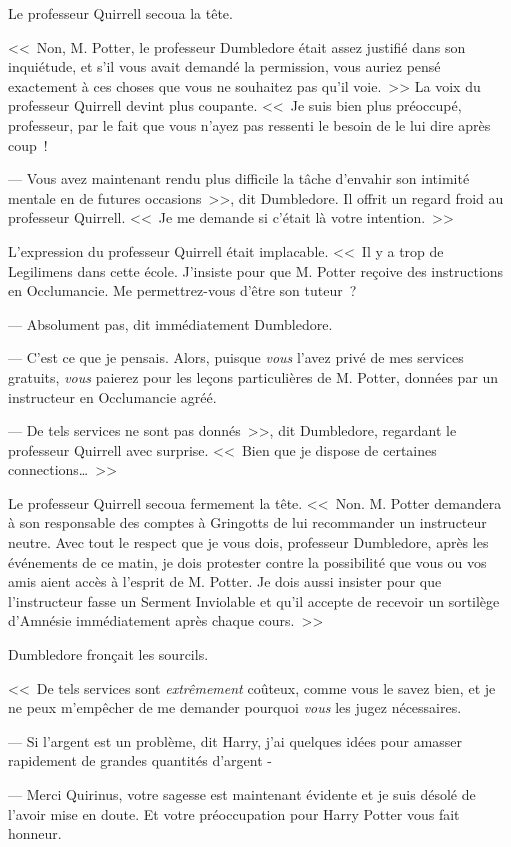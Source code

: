 Le professeur Quirrell secoua la tête.

<<~Non, M. Potter, le professeur Dumbledore était assez justifié dans son inquiétude, et s'il vous avait demandé la permission, vous auriez pensé exactement à ces choses que vous ne souhaitez pas qu'il voie.~>> La voix du professeur Quirrell devint plus coupante. <<~Je suis bien plus préoccupé, professeur, par le fait que vous n'ayez pas ressenti le besoin de le lui dire après coup~!

--- Vous avez maintenant rendu plus difficile la tâche d'envahir son intimité mentale en de futures occasions~>>, dit Dumbledore. Il offrit un regard froid au professeur Quirrell. <<~Je me demande si c'était là votre intention.~>>

L'expression du professeur Quirrell était implacable. <<~Il y a trop de Legilimens dans cette école. J'insiste pour que M. Potter reçoive des instructions en Occlumancie. Me permettrez-vous d'être son tuteur~?

--- Absolument pas, dit immédiatement Dumbledore.

--- C'est ce que je pensais. Alors, puisque \emph{vous} l'avez privé de mes services gratuits, \emph{vous} paierez pour les leçons particulières de M. Potter, données par un instructeur en Occlumancie agréé.

--- De tels services ne sont pas donnés~>>, dit Dumbledore, regardant le professeur Quirrell avec surprise. <<~Bien que je dispose de certaines connections…~>>

Le professeur Quirrell secoua fermement la tête. <<~Non. M. Potter demandera à son responsable des comptes à Gringotts de lui recommander un instructeur neutre. Avec tout le respect que je vous dois, professeur Dumbledore, après les événements de ce matin, je dois protester contre la possibilité que vous ou vos amis aient accès à l'esprit de M. Potter. Je dois aussi insister pour que l'instructeur fasse un Serment Inviolable et qu'il accepte de recevoir un sortilège d'Amnésie immédiatement après chaque cours.~>>

Dumbledore fronçait les sourcils.

<<~De tels services sont \emph{extrêmement} coûteux, comme vous le savez bien, et je ne peux m'empêcher de me demander pourquoi \emph{vous} les jugez nécessaires.

--- Si l'argent est un problème, dit Harry, j'ai quelques idées pour amasser rapidement de grandes quantités d'argent -

--- Merci Quirinus, votre sagesse est maintenant évidente et je suis désolé de l'avoir mise en doute. Et votre préoccupation pour Harry Potter vous fait honneur.

